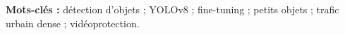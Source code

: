 \documentclass[a4paper,11pt]{article}
\begin{document}
\begin{abstract}

\end{abstract}

\medskip
\noindent\textbf{Mots-clés :} détection d'objets ; YOLOv8 ; fine-tuning ;
petits objets ; trafic urbain dense ; vidéoprotection.










\end{document}
